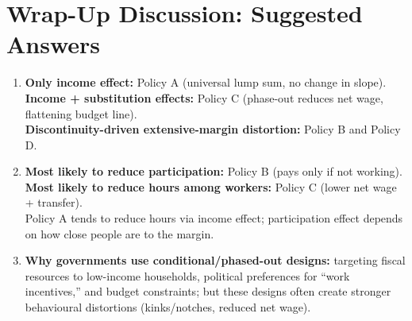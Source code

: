 \documentclass[12pt]{article}
\begin{document}
\section*{Wrap-Up Discussion: Suggested Answers}

\begin{enumerate}
\item \textbf{Only income effect:} Policy A (universal lump sum, no change in slope).\\
\textbf{Income + substitution effects:} Policy C (phase-out reduces net wage, flattening budget line).\\
\textbf{Discontinuity-driven extensive-margin distortion:} Policy B and Policy D.
\item \textbf{Most likely to reduce participation:} Policy B (pays only if not working).\\
\textbf{Most likely to reduce hours among workers:} Policy C (lower net wage + transfer).\\
Policy A tends to reduce hours via income effect; participation effect depends on how close people are to the margin.
\item \textbf{Why governments use conditional/phased-out designs:} targeting fiscal resources to low-income households, political preferences for ``work incentives,'' and budget constraints; but these designs often create stronger behavioural distortions (kinks/notches, reduced net wage).
\end{enumerate}
\end{document}
